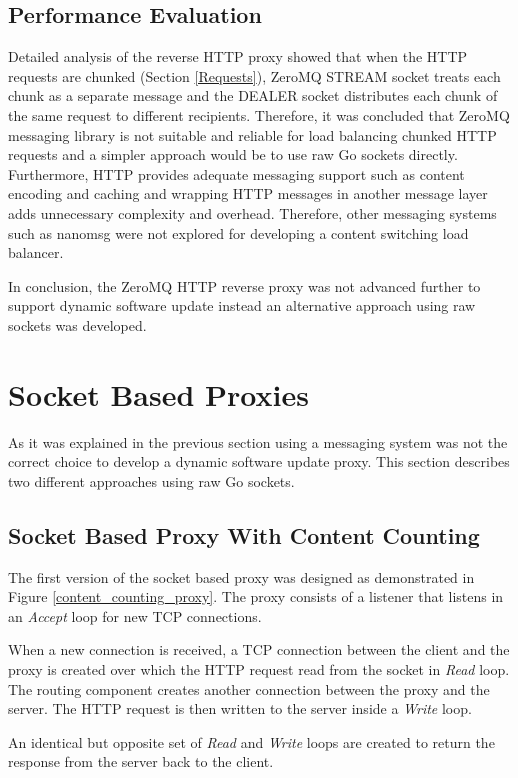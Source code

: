 \documentclass[a4paper,11pt,twoside]{report}
\begin{document}
\subsection{Performance Evaluation}
Detailed analysis of the reverse HTTP proxy showed that when the HTTP requests are chunked (Section \ref{Requests}), ZeroMQ STREAM socket treats each chunk as a separate message and the DEALER socket distributes each chunk of the same request to different recipients. Therefore, it was concluded that ZeroMQ messaging library is not suitable and reliable for load balancing chunked HTTP requests and a simpler approach would be to use raw Go sockets directly. Furthermore, HTTP provides adequate messaging support such as content encoding and caching and wrapping HTTP messages in another message layer adds unnecessary complexity and overhead. Therefore, other messaging systems such as nanomsg were not explored for developing a content switching load balancer. 

In conclusion, the ZeroMQ HTTP reverse proxy was not advanced further to support dynamic software update instead an alternative approach using raw sockets was developed. 

\section{Socket Based Proxies}
As it was explained in the previous section using a messaging system was not the correct choice to develop a dynamic software update proxy. This section describes two different approaches using raw Go sockets.   

\subsection{Socket Based Proxy With Content Counting}\label{Content-Counting}
The first version of the socket based proxy was designed as demonstrated in Figure \ref{content_counting_proxy}. The proxy consists of a listener that listens in an  \textit{Accept} loop for new TCP connections. 

When a new connection is received, a TCP connection between the client and the proxy is created over which the HTTP request read from the socket in \textit{Read} loop.  The routing component creates another connection between the proxy and the server.  The HTTP request is then written to the server inside a \textit{Write} loop.

An identical but opposite set of \textit{Read} and \textit{Write} loops are created to return the response from the server back to the client.
\end{document}
